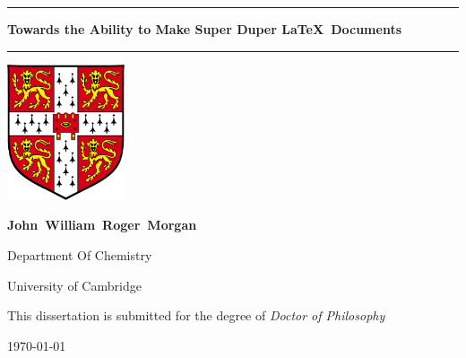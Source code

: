 \thispagestyle{empty}

\begin{center}

\hrule height 2pt
\vspace*{2ex}
{\Huge\textbf{Towards the Ability to Make Super Duper \LaTeX\ Documents}\par}
\vspace*{2ex}
\hrule height 2pt
\vspace*{10ex}
{\includegraphics[height=40mm]{Images/UnivShield}\par}
\vspace*{10ex}
{\large\textbf{John~William~Roger~Morgan}\par}
\vspace*{2ex}
{\large{Department Of Chemistry}\par}
\vspace*{2ex}
{\large{University of Cambridge}\par}
\vspace*{5ex}
{\large{This dissertation is submitted for the degree of \textit{Doctor of Philosophy}}\par}
\vspace*{5ex}
{\large{\today}\par}

\end{center}
